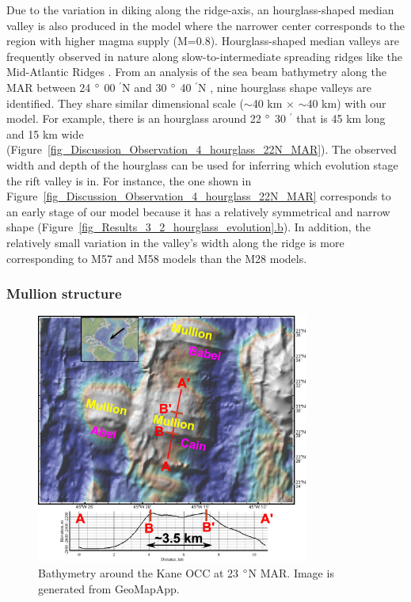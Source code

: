 Due to the variation in diking along the ridge-axis, an hourglass-shaped median valley is also produced in the model where the narrower center corresponds to the region with higher magma supply (M=$0.8$). Hourglass-shaped median valleys are frequently observed in nature along slow-to-intermediate spreading ridges like the Mid-Atlantic Ridges \citep{Sempere1993}. From an analysis of the sea beam bathymetry along the MAR between 24 $\degree$ 00 $^{\prime}$N and 30 $\degree$ 40 $^{\prime}$N \citep{Sempere1993}, nine hourglass shape valleys are identified. They share similar dimensional scale ($\sim$40 km $\times$ $\sim$40 km) with our model. For example, there is an hourglass around 22 $\degree$ 30 $^{\prime}$ that is 45 km long and 15 km wide (Figure~\hyperref[fig_Discussion_Observation_4_hourglass_22N_MAR]{\ref{fig_Discussion_Observation_4_hourglass_22N_MAR}}). The observed width and depth of the hourglass can be used for inferring which evolution stage the rift valley is in. For instance, the one shown in Figure~\hyperref[fig_Discussion_Observation_4_hourglass_22N_MAR]{\ref{fig_Discussion_Observation_4_hourglass_22N_MAR}} corresponds to an early stage of our model because it has a relatively symmetrical and narrow shape (Figure~\hyperref[fig_Results_3_2_hourglass_evolution]{\ref{fig_Results_3_2_hourglass_evolution}.b}). In addition, the relatively small variation in the valley's width along the ridge is more corresponding to M57 and M58 models than the M28 models. 

\subsubsection{Mullion structure}

\begin{figure}[h]
  \centering
    \includegraphics[width=0.8\textwidth]{./Figures/fig_Discussion_Observation_5_Mullion_Kane.eps}
  \caption[Bathymetry around the Kane OCC at 23 $\degree$N MAR.]{Bathymetry around the Kane OCC at 23 $\degree$N MAR. Image is generated from GeoMapApp.}
 \label{fig_Discussion_Observation_5_Mullion_Kane}
\end{figure}   

